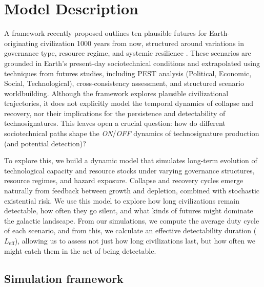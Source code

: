 \section{Model Description}\label{model-description}

A framework recently proposed outlines ten plausible futures for Earth-originating civilization 1000 years from now, structured around variations in governance type, resource regime, and systemic resilience \citep{Haqq-Misra2025-rt}. These scenarios are grounded in Earth's present-day sociotechnical conditions and extrapolated using techniques from futures studies, including PEST analysis (Political, Economic, Social, Technological), cross-consistency assessment, and structured scenario worldbuilding. Although the framework explores plausible civilizational trajectories, it does not explicitly model the temporal dynamics of collapse and recovery, nor their implications for the persistence and detectability of technosignatures. This leaves open a crucial question: how do different sociotechnical paths shape the \emph{ON}/\emph{OFF} dynamics of technosignature production (and potential detection)?

To explore this, we build a dynamic model that simulates long-term evolution of technological capacity and resource stocks under varying governance structures, resource regimes, and hazard exposure. Collapse and recovery cycles emerge naturally from feedback between growth and depletion, combined with stochastic existential risk. We use this model to explore how long civilizations remain detectable, how often they go silent, and what kinds of futures might dominate the galactic landscape. From our simulations, we compute the average duty cycle of each scenario, and from this, we calculate an effective detectability duration ($L_{\mathrm{eff}}$), allowing us to assess not just how long civilizations last, but how often we might catch them in the act of being detectable.

\subsection{Simulation framework}\label{simulation-framework}

